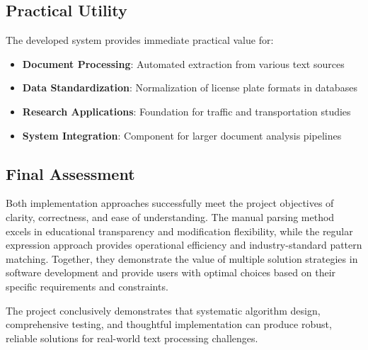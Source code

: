 \documentclass[12pt,a4paper]{article}
\begin{document}
\subsection{Practical Utility}
The developed system provides immediate practical value for:
\begin{itemize}
    \item \textbf{Document Processing}: Automated extraction from various text sources
    \item \textbf{Data Standardization}: Normalization of license plate formats in databases
    \item \textbf{Research Applications}: Foundation for traffic and transportation studies
    \item \textbf{System Integration}: Component for larger document analysis pipelines
\end{itemize}

\subsection{Final Assessment}
Both implementation approaches successfully meet the project objectives of clarity, correctness, and ease of understanding. The manual parsing method excels in educational transparency and modification flexibility, while the regular expression approach provides operational efficiency and industry-standard pattern matching. Together, they demonstrate the value of multiple solution strategies in software development and provide users with optimal choices based on their specific requirements and constraints.

The project conclusively demonstrates that systematic algorithm design, comprehensive testing, and thoughtful implementation can produce robust, reliable solutions for real-world text processing challenges.
\end{document}

